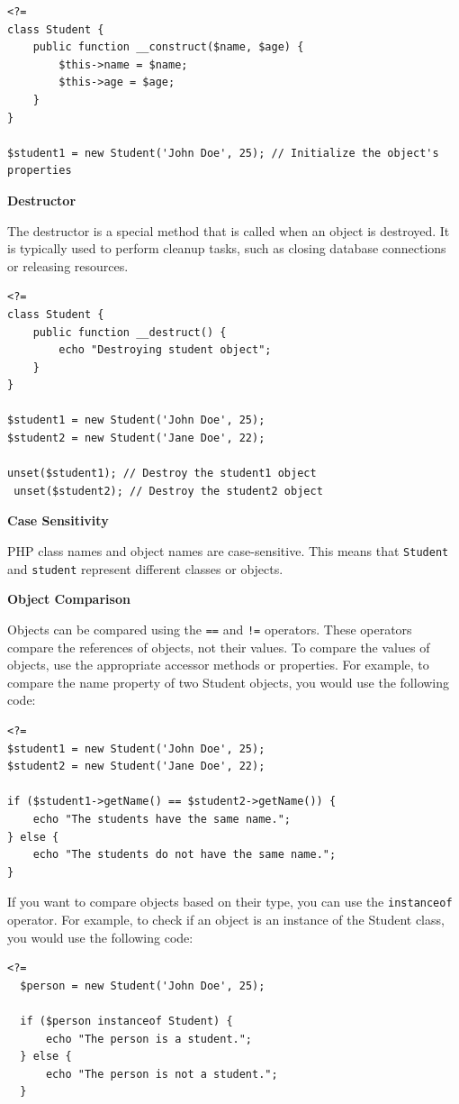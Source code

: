 \documentclass[11pt]{article}
\begin{document}
\begin{verbatim}
<?=
class Student {
    public function __construct($name, $age) {
        $this->name = $name;
        $this->age = $age;
    }
}

$student1 = new Student('John Doe', 25); // Initialize the object's properties
\end{verbatim}

\textbf{Destructor}

The destructor is a special method that is called when an object is
destroyed. It is typically used to perform cleanup tasks, such as
closing database connections or releasing resources.

\begin{verbatim}
<?=
class Student {
    public function __destruct() {
        echo "Destroying student object";
    }
}

$student1 = new Student('John Doe', 25);
$student2 = new Student('Jane Doe', 22);

unset($student1); // Destroy the student1 object
 unset($student2); // Destroy the student2 object
\end{verbatim}

\textbf{Case Sensitivity}

PHP class names and object names are case-sensitive. This means that
\texttt{Student} and \texttt{student} represent different classes or objects.

\textbf{Object Comparison}

Objects can be compared using the \texttt{==} and \texttt{!=} operators. These
operators compare the references of objects, not their values. To
compare the values of objects, use the appropriate accessor methods or
properties. For example, to compare the name property of two Student
objects, you would use the following code:
\begin{verbatim}
<?=
$student1 = new Student('John Doe', 25);
$student2 = new Student('Jane Doe', 22);

if ($student1->getName() == $student2->getName()) {
    echo "The students have the same name.";
} else {
    echo "The students do not have the same name.";
}
\end{verbatim}

If you want to compare objects based on their type, you can use the
\texttt{instanceof} operator. For example, to check if an object is an instance
of the Student class, you would use the following code:
\begin{verbatim}
<?=
  $person = new Student('John Doe', 25);

  if ($person instanceof Student) {
      echo "The person is a student.";
  } else {
      echo "The person is not a student.";
  }
\end{verbatim}
\end{document}
